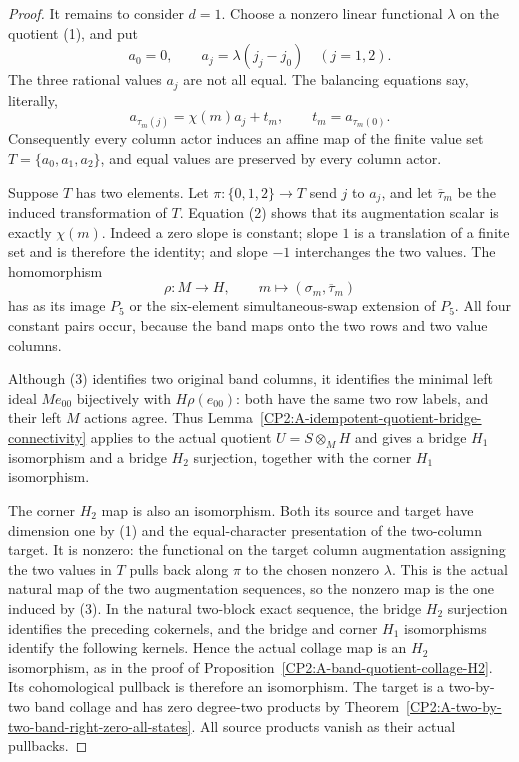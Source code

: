 \begin{proof}
It remains to consider $d=1$.  Choose a nonzero linear
functional $\lambda$ on the quotient (1), and put
\[
 a_0=0,\qquad a_j=\lambda(j_j-j_0)\quad(j=1,2).
\]
The three rational values $a_j$ are not all equal.
The balancing equations say, literally,
\[
 a_{\tau_m(j)}=\chi(m)a_j+t_m,
 \qquad t_m=a_{\tau_m(0)}.                                  \tag{2}
\]
Consequently every column actor induces an affine map
of the finite value set $T=\{a_0,a_1,a_2\}$, and equal
values are preserved by every column actor.

Suppose $T$ has two elements.  Let $\pi:\{0,1,2\}\to T$
send $j$ to $a_j$, and let $\overline\tau_m$ be the induced
transformation of $T$.  Equation (2) shows that its
augmentation scalar is exactly $\chi(m)$.
Indeed a zero slope is constant; slope $1$ is a translation
of a finite set and is therefore the identity; and slope
$-1$ interchanges the two values.
The homomorphism
\[
 \rho:M\longrightarrow H,
 \qquad m\longmapsto(\sigma_m,\overline\tau_m)
                                                               \tag{3}
\]
has as its image $P_5$ or the six-element simultaneous-swap
extension of $P_5$.  All four constant pairs occur, because
the band maps onto the two rows and two value columns.

Although (3) identifies two original band columns, it
identifies the minimal left ideal $Me_{00}$ bijectively
with $H\rho(e_{00})$: both have the same two row labels,
and their left $M$ actions agree.  Thus
Lemma~\ref{CP2:A-idempotent-quotient-bridge-connectivity}
applies to the actual quotient
$U=S\otimes_M H$ and gives a bridge $H_1$ isomorphism
and a bridge $H_2$ surjection, together with the corner
$H_1$ isomorphism.

The corner $H_2$ map is also an isomorphism.
Both its source and target have dimension one by (1)
and the equal-character presentation of the two-column
target.  It is nonzero: the functional on the target
column augmentation assigning the two values in $T$
pulls back along $\pi$ to the chosen nonzero $\lambda$.
This is the actual natural map of the two augmentation
sequences, so the nonzero map is the one induced by (3).
In the natural two-block exact sequence, the bridge
$H_2$ surjection identifies the preceding cokernels,
and the bridge and corner $H_1$ isomorphisms identify
the following kernels.  Hence the actual collage map
is an $H_2$ isomorphism, as in the proof of
Proposition~\ref{CP2:A-band-quotient-collage-H2}.
Its cohomological pullback is therefore an isomorphism.
The target is a two-by-two band collage and has zero
degree-two products by
Theorem~\ref{CP2:A-two-by-two-band-right-zero-all-states}.
All source products vanish as their actual pullbacks.


\end{proof}
